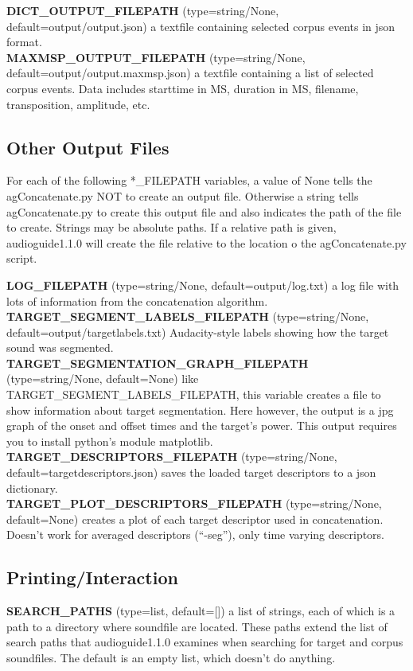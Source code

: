 \documentclass{article}
\newcommand{\optEntry}[4]{\textbf{#1} (type=#2, default=#3) #4\hspace{0.5em}\\}
\newcommand{\ag}{audioguide1.1.0\xspace}
\begin{document}
\begin{spacing}{1.2}
\optEntry{DICT\_OUTPUT\_FILEPATH}{string/None}{output/output.json}{a textfile containing selected corpus events in json format.}

\optEntry{MAXMSP\_OUTPUT\_FILEPATH}{string/None}{output/output.maxmsp.json}{a textfile containing a list of selected corpus events.  Data includes starttime in MS, duration in MS, filename, transposition, amplitude, etc.}


\subsection{Other Output Files}\label{otheroutputfiles}
For each of the following *\_FILEPATH variables, a value of None tells the agConcatenate.py NOT to create an output file.  Otherwise a string tells agConcatenate.py to create this output file and also indicates the path of the file to create.  Strings may be absolute paths.  If a relative path is given, \ag will create the file relative to the location o the agConcatenate.py script.

\optEntry{LOG\_FILEPATH}{string/None}{output/log.txt}{a log file with lots of information from the concatenation algorithm.}

\optEntry{TARGET\_SEGMENT\_LABELS\_FILEPATH}{string/None}{output/targetlabels.txt}{Audacity-style labels showing how the target sound was segmented.}

\optEntry{TARGET\_SEGMENTATION\_GRAPH\_FILEPATH}{string/None}{None}{like TARGET\_SEGMENT\_LABELS\_FILEPATH, this variable creates a file to show information about target segmentation.  Here however, the output is a jpg graph of the onset and offset times and the target's power.  This output requires you to install python's module matplotlib.}

\optEntry{TARGET\_DESCRIPTORS\_FILEPATH}{string/None}{targetdescriptors.json}{saves the loaded target descriptors to a json dictionary.}

\optEntry{TARGET\_PLOT\_DESCRIPTORS\_FILEPATH}{string/None}{None}{creates a plot of each target descriptor used in concatenation.  Doesn't work for averaged descriptors (``-seg''), only time varying descriptors.}



\subsection{Printing/Interaction}
\optEntry{SEARCH\_PATHS}{list}{[]}{a list of strings, each of which is a path to a directory where soundfile are located.  These paths extend the list of search paths that \ag examines when searching for target and corpus soundfiles.  The default is an empty list, which doesn't do anything.}


\end{spacing}
\end{document}
